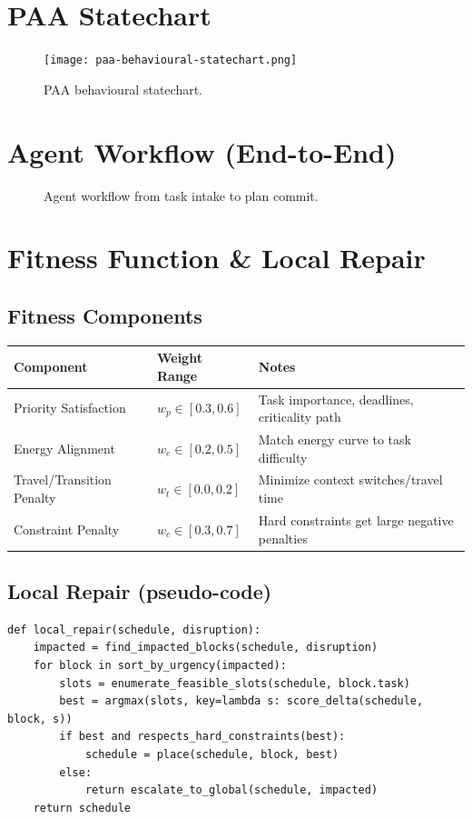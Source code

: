 \documentclass[12pt,oneside]{report}
\begin{document}
\section{PAA Statechart}
\begin{figure}[h]
\centering
\texttt{[image: paa-behavioural-statechart.png]}
\caption{PAA behavioural statechart.}
\label{fig:paa-state}
\end{figure}


\section{Agent Workflow (End-to-End)}
\begin{figure}[h]
\centering

\caption{Agent workflow from task intake to plan commit.}
\label{fig:agent-workflow}
\end{figure}

\section{Fitness Function \& Local Repair}
\subsection*{Fitness Components}
\begin{tabularx}{\textwidth}{@{}p{3.6cm}p{3.2cm}X@{}}
\toprule
\textbf{Component} & \textbf{Weight Range} & \textbf{Notes} \\
\midrule
Priority Satisfaction & $w_p \in [0.3,0.6]$ & Task importance, deadlines, criticality path \\
Energy Alignment & $w_e \in [0.2,0.5]$ & Match energy curve to task difficulty \\
Travel/Transition Penalty & $w_t \in [0.0,0.2]$ & Minimize context switches/travel time \\
Constraint Penalty & $w_c \in [0.3,0.7]$ & Hard constraints get large negative penalties \\
\bottomrule
\end{tabularx}

\subsection*{Local Repair (pseudo-code)}
\begin{lstlisting}[style=code,caption={Greedy local repair at disruption}]
def local_repair(schedule, disruption):
    impacted = find_impacted_blocks(schedule, disruption)
    for block in sort_by_urgency(impacted):
        slots = enumerate_feasible_slots(schedule, block.task)
        best = argmax(slots, key=lambda s: score_delta(schedule, block, s))
        if best and respects_hard_constraints(best):
            schedule = place(schedule, block, best)
        else:
            return escalate_to_global(schedule, impacted)
    return schedule
\end{lstlisting}
\end{document}
